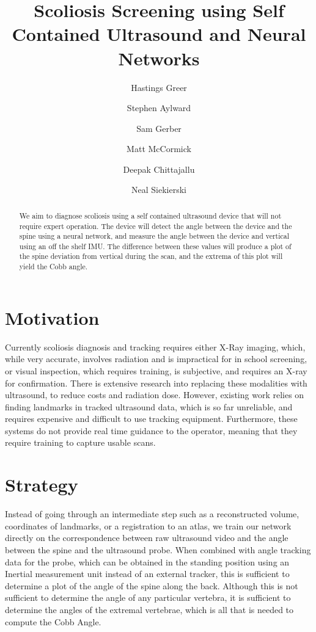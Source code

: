 \documentclass{llncs}
\begin{document}
%
\frontmatter
%
\pagestyle{headings}
\title{Scoliosis Screening using Self Contained Ultrasound and Neural Networks}
\author{Hastings Greer \and Stephen Aylward \and Sam Gerber \and Matt McCormick \and Deepak Chittajallu \and Neal Siekierski }
%
\mainmatter
\maketitle

\begin{abstract}
We aim to diagnose scoliosis using a self contained ultrasound device that will not require expert operation. The device will detect the angle between the device and the spine using a neural network, and measure the angle between the device and vertical using an off the shelf IMU. The difference between these values will produce a plot of the spine deviation from vertical during the scan, and the extrema of this plot will yield the Cobb angle.
\end{abstract}


\section{Motivation}
Currently scoliosis diagnosis and tracking requires either X-Ray imaging, which, while very accurate, involves radiation and is impractical for in school screening, or visual inspection, which requires training, is subjective, and requires an X-ray for confirmation. There is extensive research into replacing these modalities with ultrasound, to reduce costs and radiation dose. However, existing work relies on finding landmarks in tracked ultrasound data, which is so far unreliable, and requires expensive and difficult to use tracking equipment. Furthermore, these systems do not provide real time guidance to the operator, meaning that they require training to capture usable scans. 

\section{Strategy}
Instead of going through an intermediate step such as a reconstructed volume, coordinates of landmarks, or a registration to an atlas, we train our network directly on the correspondence between raw ultrasound video and the angle between the spine and the ultrasound probe. When combined with angle tracking data for the probe, which can be obtained in the standing position using an Inertial measurement unit instead of an external tracker, this is sufficient to determine a plot of the angle of the spine along the back. Although this is not sufficient to determine the angle of any particular vertebra, it is sufficient to determine the angles of the extremal vertebrae, which is all that is needed to compute the Cobb Angle.
\end{document}
